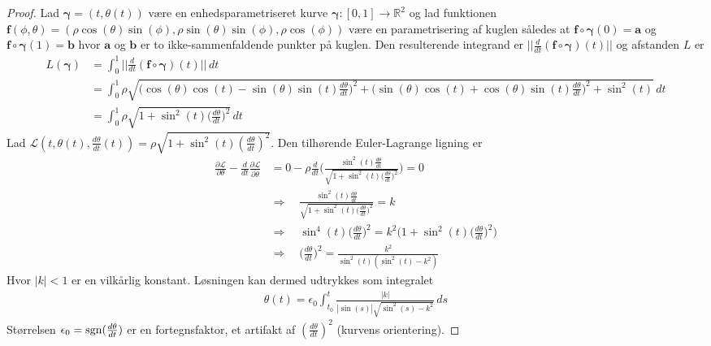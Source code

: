 \begin{proof}
Lad ${\boldsymbol \gamma} =(t, \theta(t)) $ være en enhedsparametriseret kurve ${\boldsymbol \gamma} : [0,1] \rightarrow \mathbb{R}^2$ og lad funktionen $\mathbf{f}(\phi,\theta) = (\rho\cos(\theta)\sin(\phi), \rho\sin(\theta)\sin(\phi), \rho\cos(\phi))$ være en parametrisering af kuglen således at $\mathbf{f} \circ {\boldsymbol \gamma}(0)=\mathbf{a}$ og $\mathbf{f} \circ {\boldsymbol \gamma}(1)=\mathbf{b}$ hvor $\mathbf{a}$ og $\mathbf{b}$ er to ikke-sammenfaldende punkter på kuglen. Den resulterende integrand er $|| \frac{d}{dt}(\mathbf{f} \circ {\boldsymbol \gamma})(t) ||$ og afstanden $L$ er
\begin{align*}
L({\boldsymbol \gamma}) &= \int_0^1 ||\frac{d}{dt}(\mathbf{f} \circ {\boldsymbol \gamma})(t) || \, dt \\
&= \int_0^1 \rho\sqrt{\big( \cos(\theta)\cos(t)-\sin(\theta)\sin(t) \frac{d\theta}{dt} \big)^2 + \big(\sin(\theta)\cos(t)+\cos(\theta)\sin(t) \frac{d\theta}{dt} \big)^2 + \sin^2(t)} \, dt\\
&= \int_0^1 \rho\sqrt{1+\sin^2(t) \big(\frac{d\theta}{dt} \big)^2} \, dt
\end{align*}
Lad $\mathcal{L}(t,\theta(t),\frac{d\theta}{dt}(t))= \rho\sqrt{1+\sin^2(t) (\frac{d\theta}{dt})^2}$. Den tilhørende Euler-Lagrange ligning er
\begin{align*}
\frac{\partial \mathcal{L}}{\partial \theta} - \frac{d}{dt} \frac{\partial \mathcal{L}}{\partial \dot{\theta}} &= 0-\rho \frac{d}{dt}\Big( \frac{\sin^2(t)\frac{d\theta}{dt}}{\sqrt{1+\sin^2(t) \big(\frac{d\theta}{dt} \big)^2}} \Big) = 0 \\
&\Rightarrow \quad \frac{\sin^2(t)\frac{d\theta}{dt}}{\sqrt{1+\sin^2(t) \big(\frac{d\theta}{dt} \big)^2}} = k \\
&\Rightarrow \quad
\sin^4(t)\big(\frac{d\theta}{dt} \big)^2 = k^2 \Big( 1+\sin^2(t) \big(\frac{d\theta}{dt} \big)^2 \Big) \\
&\Rightarrow \quad
\big(\frac{d\theta}{dt} \big)^2 = \frac{k^2}{\sin^2(t)(\sin^2(t)-k^2)}
\end{align*}
Hvor $|k|<1$ er en vilkårlig konstant. Løsningen kan dermed udtrykkes som integralet
\begin{align*}
\theta(t) = \epsilon_0 \int_{t_0}^t \frac{|k|}{|\sin(s)|\sqrt{\sin^2(s)-k^2}} \, ds
\end{align*}
Størrelsen $\epsilon_0 = \textnormal{sgn}(\frac{d\theta}{dt}) $ er en fortegnsfaktor, et artifakt af $(\frac{d\theta}{dt})^2$ (kurvens orientering).



\end{proof}
